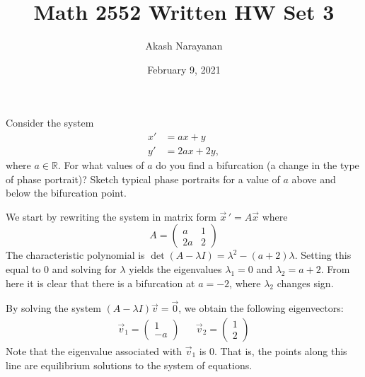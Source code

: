 \documentclass[11pt, titlepage]{article}
\title{Math 2552 Written HW Set 3}
\author{Akash Narayanan}
\date{February 9, 2021}
\begin{document}
  \maketitle

  \begin{problem}[Judson 3.2.11]
    Consider the system
    \begin{align*}
      x' &= ax + y \\
      y' &= 2ax + 2y,
    \end{align*}
    where \(a \in \mathbb{R}\).
    For what values of \(a\) do you find a bifurcation
    (a change in the type of phase portrait)?
    Sketch typical phase portraits for a value of \(a\) above and below the bifurcation point.
  \end{problem}

  \begin{solution}
    We start by rewriting the system in matrix form \(\vec{x} \,' = A \vec{x}\) where
    \begin{equation*}
      A =
      \begin{pmatrix}
        a & 1 \\
        2a & 2
      \end{pmatrix}
    \end{equation*}
    The characteristic polynomial is \(\det (A - \lambda I) = \lambda^{2} - (a + 2) \lambda\).
    Setting this equal to 0 and solving for \(\lambda\) yields the eigenvalues \(\lambda_{1} = 0\) and \(\lambda_{2} = a + 2\).
    From here it is clear that there is a bifurcation at \(a = -2\), where \(\lambda_{2}\) changes sign.

    By solving the system \((A - \lambda I)\vec{v} = \vec{0}\), we obtain the following eigenvectors:
    \begin{align*}
      \vec{v}_{1} =
      \begin{pmatrix}
        1 \\
        -a
      \end{pmatrix}
      &&
      \vec{v}_{2} =
      \begin{pmatrix}
        1 \\
        2
      \end{pmatrix}
    \end{align*}
    Note that the eigenvalue associated with \(\vec{v}_{1}\) is 0.
    That is, the points along this line are equilibrium solutions to the system of equations.


\end{solution}
\end{document}
